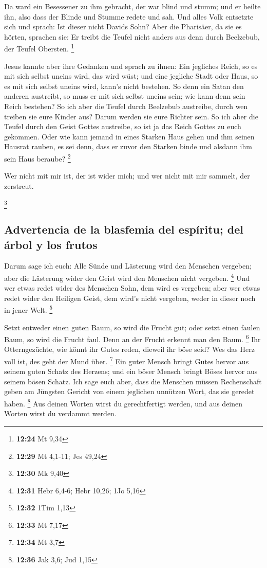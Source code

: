  Da ward ein Besessener zu ihm gebracht, der war blind
und stumm; und er heilte ihn, also dass der Blinde und Stumme redete und
sah.  Und alles Volk entsetzte sich und sprach: Ist
dieser nicht Davids Sohn?  Aber die Pharisäer, da sie es
hörten, sprachen sie: Er treibt die Teufel nicht anders aus denn durch
Beelzebub, der Teufel Obersten. \footnote{\textbf{12:24} Mt 9,34}

 Jesus kannte aber ihre Gedanken und sprach zu ihnen: Ein
jegliches Reich, so es mit sich selbst uneins wird, das wird wüst; und
eine jegliche Stadt oder Haus, so es mit sich selbst uneins wird, kann's
nicht bestehen.  So denn ein Satan den anderen austreibt,
so muss er mit sich selbst uneins sein; wie kann denn sein Reich
bestehen?  So ich aber die Teufel durch Beelzebub
austreibe, durch wen treiben sie eure Kinder aus? Darum werden sie eure
Richter sein.  So ich aber die Teufel durch den Geist
Gottes austreibe, so ist ja das Reich Gottes zu euch gekommen.
 Oder wie kann jemand in eines Starken Haus gehen und ihm
seinen Hausrat rauben, es sei denn, dass er zuvor den Starken binde und
alsdann ihm sein Haus beraube? \footnote{\textbf{12:29} Mt 4,1-11; Jes
  49,24}

 Wer nicht mit mir ist, der ist wider mich; und wer nicht
mit mir sammelt, der zerstreut.

\footnote{\textbf{12:30} Mk 9,40}

\hypertarget{advertencia-de-la-blasfemia-del-espuxedritu-del-uxe1rbol-y-los-frutos}{%
\subsection{Advertencia de la blasfemia del espíritu; del árbol y los
frutos}\label{advertencia-de-la-blasfemia-del-espuxedritu-del-uxe1rbol-y-los-frutos}}

 Darum sage ich euch: Alle Sünde und Lästerung wird den
Menschen vergeben; aber die Lästerung wider den Geist wird den Menschen
nicht vergeben. \footnote{\textbf{12:31} Hebr 6,4-6; Hebr 10,26; 1Jo
  5,16}  Und wer etwas redet wider des Menschen Sohn, dem
wird es vergeben; aber wer etwas redet wider den Heiligen Geist, dem
wird's nicht vergeben, weder in dieser noch in jener Welt. \footnote{\textbf{12:32}
  1Tim 1,13}

 Setzt entweder einen guten Baum, so wird die Frucht gut;
oder setzt einen faulen Baum, so wird die Frucht faul. Denn an der
Frucht erkennt man den Baum. \footnote{\textbf{12:33} Mt 7,17}
 Ihr Otterngezüchte, wie könnt ihr Gutes reden, dieweil
ihr böse seid? Wes das Herz voll ist, des geht der Mund über.
\footnote{\textbf{12:34} Mt 3,7}  Ein guter Mensch bringt
Gutes hervor aus seinem guten Schatz des Herzens; und ein böser Mensch
bringt Böses hervor aus seinem bösen Schatz.  Ich sage
euch aber, dass die Menschen müssen Rechenschaft geben am Jüngsten
Gericht von einem jeglichen unnützen Wort, das sie geredet haben.
\footnote{\textbf{12:36} Jak 3,6; Jud 1,15}  Aus deinen
Worten wirst du gerechtfertigt werden, und aus deinen Worten wirst du
verdammt werden.

